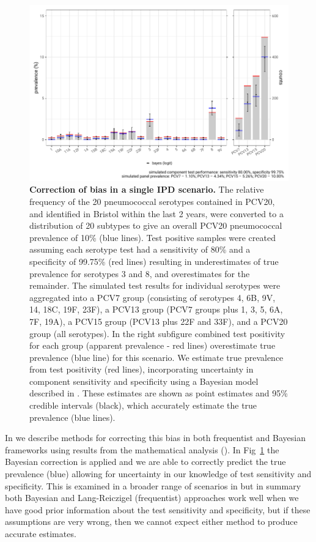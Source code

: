 \documentclass[10pt,letterpaper]{article}
\begin{document}
\begin{figure}[h!]
\centerline{\includegraphics{fig/simulation_result_bayes_v2.pdf}}
\caption{{\bf Correction of bias in a single IPD scenario.}
The relative frequency of the 20 pneumococcal serotypes contained in PCV20, and identified in Bristol within the last 2 years, were converted to a distribution of 20 subtypes to give an overall PCV20 pneumococcal prevalence of 10\% (blue lines). Test positive samples were created assuming each serotype test had a sensitivity of 80\% and a specificity of 99.75\% (red lines) resulting in underestimates of true prevalence for serotypes 3 and 8, and overestimates for the remainder. The simulated test results for individual serotypes were aggregated into a PCV7 group (consisting of serotypes 4, 6B, 9V, 14, 18C, 19F, 23F), a PCV13 group (PCV7 groups plus 1, 3, 5, 6A, 7F, 19A), a PCV15 group (PCV13 plus 22F and 33F), and a PCV20 group (all serotypes). In the right subfigure combined test positivity for each group (apparent prevalence - red lines) overestimate true prevalence (blue line) for this scenario. We estimate true prevalence from test positivity (red lines), incorporating uncertainty in component sensitivity and specificity using a Bayesian model described in . These estimates are shown as point estimates and 95\% credible intervals (black), which accurately estimate the true prevalence (blue lines).}
\label{fig5}
\end{figure}

In  we describe methods for correcting this bias in both frequentist and Bayesian frameworks using results from the mathematical analysis (). In Fig~\ref{fig5} the Bayesian correction is applied and we are able to correctly predict the true prevalence (blue) allowing for uncertainty in our knowledge of test sensitivity and specificity. This is examined in a broader range of scenarios in  but in summary both Bayesian and Lang-Reiczigel (frequentist) approaches work well when we have good prior information about the test sensitivity and specificity, but if these assumptions are very wrong, then we cannot expect either method to produce accurate estimates.
\end{document}
